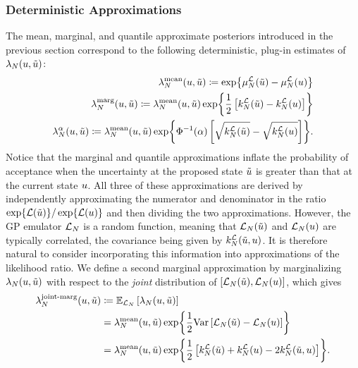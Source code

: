 \documentclass[12pt]{article}
\begin{document}
\subsubsection{Deterministic Approximations}
 The mean, marginal, and quantile approximate posteriors introduced in the previous 
section correspond to the following deterministic, plug-in estimates of $\Em[\Ndesign]{\likRatio}(\Par, \propPar)$:
\begin{align}
\llikEmMean[\Ndesign]{\likRatio}(\Par, \propPar) 
\coloneqq \Exp{\emMean[\Ndesign]{\llik}(\propPar) - \emMean[\Ndesign]{\llik}(\Par)} \\
\llikEmMarg[\Ndesign]{\likRatio}(\Par, \propPar) 
\Def \llikEmMean[\Ndesign]{\likRatio}(\Par, \propPar) 
\Exp{\frac{1}{2}\left[\emKer[\Ndesign]{\llik}(\propPar) - \emKer[\Ndesign]{\llik}(\Par)\right]} \\
\llikEmQ[\Ndesign]{\likRatio}(\Par, \propPar) 
\Def \llikEmMean[\Ndesign]{\likRatio}(\Par, \propPar) 
\Exp{\GaussianCDF^{-1}(\quantileProb)  \left[\sqrt{\emKer[\Ndesign]{\llik}(\propPar)} - \sqrt{\emKer[\Ndesign]{\llik}(\Par)}\right]}.
\end{align}
Notice that the marginal and quantile approximations inflate the probability of acceptance when the 
uncertainty at the proposed state $\propPar$ is greater than that at the current state $\Par$.
All three of these approximations are derived by independently approximating the numerator and denominator 
in the ratio $\Exp{\llik(\propPar)} / \Exp{\llik(\Par)}$ and then dividing the two approximations.
However, the GP emulator $\llikEm[\Ndesign]$ is a random function, meaning that 
$\llikEm[\Ndesign](\propPar)$ and $\llikEm[\Ndesign](\Par)$ are typically correlated, the covariance
being given by $\emKer[\Ndesign]{\llik}(\propPar, \Par)$. It is therefore natural to consider incorporating 
this information into approximations of the likelihood ratio. We define a second marginal approximation 
by marginalizing $\Em[\Ndesign]{\likRatio}(\Par, \propPar)$ with respect to the \textit{joint} 
distribution of $[\llikEm[\Ndesign](\propPar), \llikEm[\Ndesign](\Par)]$, which gives
\begin{align}
\llikEmJointMarg[\Ndesign]{\likRatio}(\Par, \propPar) 
&\Def \E_{\llikEm[\Ndesign]} \left[\Em[\Ndesign]{\likRatio}(\Par, \propPar) \right] \\
&= \llikEmMean[\Ndesign]{\likRatio}(\Par, \propPar)  \Exp{\frac{1}{2} \Var\left[\llikEm[\Ndesign](\propPar) - \llikEm[\Ndesign](\Par) \right]} \\
&=  \llikEmMean[\Ndesign]{\likRatio}(\Par, \propPar)  
\Exp{\frac{1}{2}\left[\emKer[\Ndesign]{\llik}(\propPar) + \emKer[\Ndesign]{\llik}(\Par) - 2\emKer[\Ndesign]{\llik}(\propPar, \Par) \right]}. 
\label{lik_ratio_joint_marg}
\end{align} 
\end{document}
